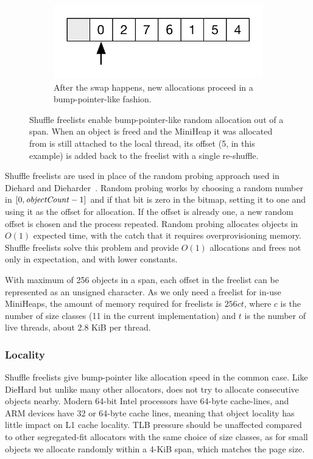 \begin{figure}[!t]
  \begin{subfigure}[t]{.4\textwidth}
    \centering
    \includegraphics[width=\textwidth]{figures/shuffle-freelist_c}
    \caption{After the swap happens, new allocations proceed in a
      bump-pointer-like fashion.}
  \end{subfigure}
  \caption{Shuffle freelists enable bump-pointer-like random
    allocation out of a span.  When an object is freed and the
    MiniHeap it was allocated from is still attached to the local
    thread, its offset (5, in this example) is added back to the
    freelist with a single re-shuffle.}
  \label{fig:shuffle-freelists}
\end{figure}

Shuffle freelists are used in place of the random probing approach
used in Diehard and
Dieharder~\cite{1134000,Novark:2010:DSH:1866307.1866371}.  Random
probing works by choosing a random number in
$[0,\text{\textit{objectCount}}-1]$ and if that bit is zero in the
bitmap, setting it to one and using it as the offset for allocation.
If the offset is already one, a new random offset is chosen and the
process repeated.  Random probing allocates objects in $O(1)$ expected
time, with the catch that it requires overprovisioning memory.
Shuffle freelists solve this problem and provide $O(1)$ allocations
and frees not only in expectation, and with lower constants.

With maximum of 256 objects in a span, each offset in the freelist can
be represented as an unsigned character.  As we only need a freelist
for in-use MiniHeaps, the amount of memory required for freelists is
$256ct$, where $c$ is the number of size classes (11 in the current
implementation) and $t$ is the number of live threads, about 2.8 KiB
per thread.

\subsubsection{Locality}

Shuffle freelists give \Mesh bump-pointer like allocation speed in the
common case.  Like DieHard but unlike many other allocators, \Mesh
does not try to allocate consecutive objects nearby.  Modern 64-bit
Intel processors have 64-byte cache-lines, and ARM devices have 32 or
64-byte cache lines, meaning that object locality has little impact on
L1 cache locality.  TLB pressure should be unaffected compared to
other segregated-fit allocators with the same choice of size classes,
as for small objects we allocate randomly within a 4-KiB span, which
matches the page size.

